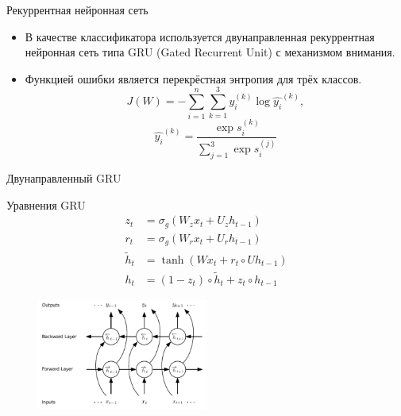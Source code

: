 \documentclass{beamer}
\begin{document}
\begin{frame}{Рекуррентная нейронная сеть}
	\begin{itemize}
	\item В качестве классификатора используется двунаправленная рекуррентная нейронная сеть типа GRU (Gated Recurrent Unit) с механизмом внимания.\\
	\item Функцией ошибки является перекрёстная энтропия для трёх классов.\\
	$$ J(W)=-\sum_{i=1}^{n}\sum_{k=1}^{3}y_{i}^{(k)}\log{\hat{y_{i}}^{(k)}},
	$$$$
	\hat{y_{i}}^{(k)} = \frac{\exp{s_{i}^{(k)}}}{\sum_{j=1}^{3}\exp{s_{i}^{(j)}}}
	$$
	\end{itemize}

\end{frame}
\begin{frame}{Двунаправленный GRU}
	\begin{block}{Уравнения GRU}
	\begin{align}
	z_{t}&=\sigma_{g}(W_{z}x_{t}+U_{z}h_{t-1})\\
	r_{t}&=\sigma_{g}(W_{r}x_{t}+U_{r}h_{t-1})\\
	\tilde{h}_{t}&=\tanh(Wx_{t}+r_{t}\circ Uh_{t-1})\\
	h_{t}&=(1-z_{t})\circ \tilde{h}_{t}+z_{t}\circ h_{t-1}
	\end{align}	

	\end{block}
\begin{figure}[!h]
  \includegraphics[width=0.5\textwidth]{images/birnn.png}
\end{figure}
\end{frame}
\end{document}
